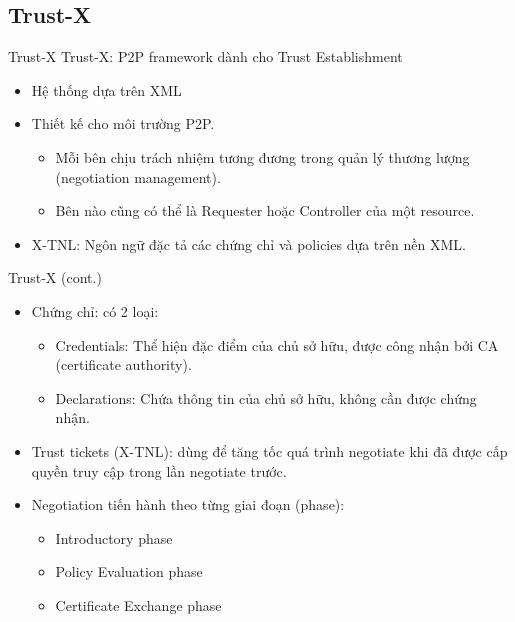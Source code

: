 \documentclass[11pt]{beamer}
\begin{document}
\subsection{Trust-X}
\begin{frame}{Trust-X}
Trust-X: P2P framework dành cho Trust Establishment\cite{10.1109/TKDE.2004.1318565}
\begin{itemize}
\item Hệ thống dựa trên XML
\item Thiết kế cho môi trường P2P.
\begin{itemize}
\item Mỗi bên chịu trách nhiệm tương đương trong quản lý thương lượng (negotiation management).
\item Bên nào cũng có thể là Requester hoặc Controller của một resource.
\end{itemize}
\item X-TNL: Ngôn ngữ đặc tả các chứng chỉ và policies dựa trên nền XML.
\end{itemize}
\end{frame}

\begin{frame}{Trust-X (cont.)}
\begin{itemize}
\item Chứng chỉ: có 2 loại:
\begin{itemize}
\item Credentials: Thể hiện đặc điểm của chủ sở hữu, được công nhận bởi CA (certificate authority).
\item Declarations: Chứa thông tin của chủ sở hữu, không cần được chứng nhận.
\end{itemize}
\item Trust tickets (X-TNL): dùng để tăng tốc quá trình negotiate khi đã được cấp quyền truy cập trong lần negotiate trước.
\item Negotiation tiến hành theo từng giai đoạn (phase):
\begin{itemize}
\item Introductory phase
\item Policy Evaluation phase
\item Certificate Exchange phase
\end{itemize}
\end{itemize}
\end{frame}
\end{document}
